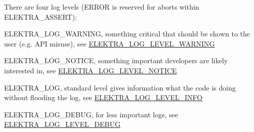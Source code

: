 There are four log levels (E\+R\+R\+OR is reserved for aborts within {\ttfamily E\+L\+E\+K\+T\+R\+A\+\_\+\+A\+S\+S\+E\+RT})\+:


\begin{DoxyItemize}
\item {\ttfamily E\+L\+E\+K\+T\+R\+A\+\_\+\+L\+O\+G\+\_\+\+W\+A\+R\+N\+I\+NG}, something critical that should be shown to the user (e.\+g. A\+PI misuse), see \mbox{\hyperlink{kdblogger_8h_a4096a2ccd61c6f5ad60e9015fd1bbb4ba0524fff5c46e0cf07287c473c46cc8e2}{E\+L\+E\+K\+T\+R\+A\+\_\+\+L\+O\+G\+\_\+\+L\+E\+V\+E\+L\+\_\+\+W\+A\+R\+N\+I\+NG}}
\item {\ttfamily E\+L\+E\+K\+T\+R\+A\+\_\+\+L\+O\+G\+\_\+\+N\+O\+T\+I\+CE}, something important developers are likely interested in, see \mbox{\hyperlink{kdblogger_8h_a4096a2ccd61c6f5ad60e9015fd1bbb4ba329fc1e04c797ab8e54a137b21f41baf}{E\+L\+E\+K\+T\+R\+A\+\_\+\+L\+O\+G\+\_\+\+L\+E\+V\+E\+L\+\_\+\+N\+O\+T\+I\+CE}}
\item {\ttfamily E\+L\+E\+K\+T\+R\+A\+\_\+\+L\+OG}, standard level gives information what the code is doing without flooding the log, see \mbox{\hyperlink{kdblogger_8h_a4096a2ccd61c6f5ad60e9015fd1bbb4ba01618746c91d9d1090f599f604b9b832}{E\+L\+E\+K\+T\+R\+A\+\_\+\+L\+O\+G\+\_\+\+L\+E\+V\+E\+L\+\_\+\+I\+N\+FO}}
\item {\ttfamily E\+L\+E\+K\+T\+R\+A\+\_\+\+L\+O\+G\+\_\+\+D\+E\+B\+UG}, for less important logs, see \mbox{\hyperlink{kdblogger_8h_a4096a2ccd61c6f5ad60e9015fd1bbb4ba24c7a4c44a8b99b978dc99806d083386}{E\+L\+E\+K\+T\+R\+A\+\_\+\+L\+O\+G\+\_\+\+L\+E\+V\+E\+L\+\_\+\+D\+E\+B\+UG}} 
\end{DoxyItemize}